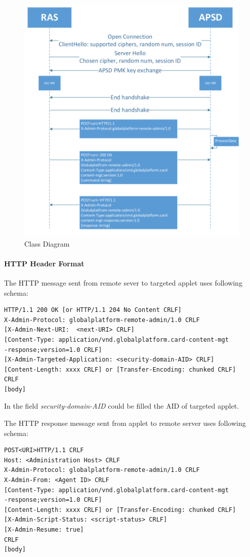 \documentclass[]{llncs}
\begin{document}
\begin{figure}[!htbp]

	\centering
	\includegraphics[width=1.2\textwidth]{communication-flow}
		\caption[ ]{Class Diagram}
	\label{fig:communication-flow}
\end{figure}

\paragraph{HTTP Header Format}
The HTTP message sent from remote sever to targeted applet uses following schema\cite{gp}:
\begin{verbatim}
HTTP/1.1 200 OK [or HTTP/1.1 204 No Content CRLF]
X-Admin-Protocol: globalplatform-remote-admin/1.0 CRLF
[X-Admin-Next-URI:  <next-URI> CRLF]
[Content-Type: application/vnd.globalplatform.card-content-mgt
-response;version=1.0 CRLF]
[X-Admin-Targeted-Application: <security-domain-AID> CRLF]
[Content-Length: xxxx CRLF] or [Transfer-Encoding: chunked CRLF]
CRLF
[body]
\end{verbatim}
In the field \emph{security-domain-AID} could be filled the AID of targeted applet.


The HTTP response message sent from applet to remote server uses following schema\cite{gp}:
\begin{verbatim}
POST<URI>HTTP/1.1 CRLF
Host: <Administration Host> CRLF
X-Admin-Protocol: globalplatform-remote-admin/1.0 CRLF
X-Admin-From: <Agent ID> CRLF
[Content-Type: application/vnd.globalplatform.card-content-mgt
-response;version=1.0 CRLF]
[Content-Length: xxxx CRLF] or [Transfer-Encoding: chunked CRLF]
[X-Admin-Script-Status: <script-status> CRLF]
[X-Admin-Resume: true]
CRLF
[body]
\end{verbatim}
\end{document}
